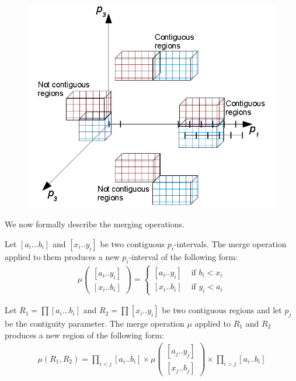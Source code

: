 	\begin{figure}[t]
		\center
		\includegraphics[width=0.8\columnwidth]{img/contiguous_regions}
	\end{figure}

We now formally describe the merging operations.
\begin{definition}
Let $\left[a_{i}\dots b_{i}\right]$ and $\left[x_{i}..y_{i}\right]$ be two contiguous $p_i$-intervals. The merge operation applied to them produces a new $p_i$-interval of the following form:
	\begin{align}
		\mu	 \left( \begin{array}{l}
				\left[a_{i}..y_{i}\right] \\
				\left[x_{i}..b_{i}\right]
		     \end{array} \right)
		=\begin{cases}
			\left[a_{i}..y_{i}\right] & \mbox{ if }b_{i}<x_{i}\\
			\left[x_{i}..b_{i}\right] & \mbox{ if }y_{i}<a_{i}
		\end{cases}
	\end{align}

\end{definition}

\begin{definition}
Let $R_{1}=\prod\left[a_{i}\dots b_{i}\right]$ and $R_{2}=\prod\left[x_{i}..y_{i}\right]$ be two contiguous regions and let $p_j$ be the contiguity parameter. 
The merge operation $\mu$ applied to $R_1$ and $R_2$ produces a new region of the following form:
	\begin{align}
		\mu(R_1,R_2)=\prod_{i<j}\left[a_{i}..b_{i}\right]
		\times
		\mu	 \left( \begin{array}{l}
				\left[a_{j}..y_{j}\right] \\
				\left[x_{j}..b_{j}\right]
		     \end{array} \right)
		\times
		\prod_{i>j}\left[a_{i}..b_{i}\right]
	\end{align}
\end{definition}

